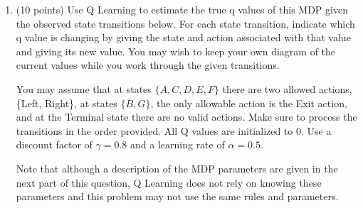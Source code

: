 \documentclass[12pt]{article}
\newenvironment{qparts}{\begin{enumerate}[{(}a{)}]}{\end{enumerate}}
\begin{document}
\begin{qparts}
  \item (10 points) Use Q Learning to estimate the true q values of this MDP given the observed state transitions below. For each state transition, indicate which q value is changing by giving the state and action associated with that value and giving its new value. You may wish to keep your own diagram of the current values while you work through the given transitions.

  You may assume that at states $\{A, C, D, E, F\}$ there are two allowed actions, \{Left, Right\}, at states $\{B, G\}$, the only allowable action is the Exit action, and at the Terminal state there are no valid actions. Make sure to process the transitions in the order provided. All Q values are initialized to 0. Use a discount factor of $\gamma=0.8$ and a learning rate of $\alpha=0.5$.

  Note that although a description of the MDP parameters are given in the next part of this question, Q Learning does not rely on knowing these parameters and this problem may not use the same rules and parameters.



\end{qparts}
\end{document}
